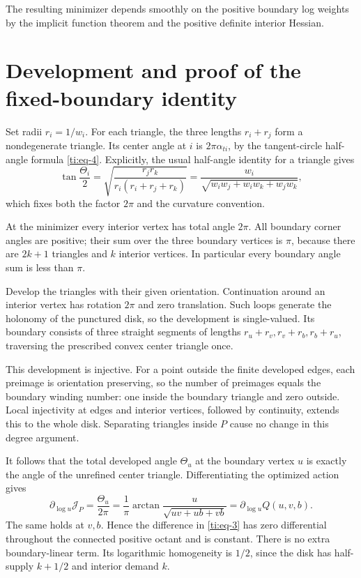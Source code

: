 \documentclass[11pt]{article}
\numberwithin{equation}{section}
\theoremstyle{definition}\newtheorem{definition}[theorem]{Definition}
\theoremstyle{remark}\newtheorem{remark}[theorem]{Remark}
\begin{document}
The resulting minimizer depends smoothly on the positive boundary log weights by the implicit function theorem and the positive definite interior Hessian.

\section{Development and proof of the fixed-boundary identity}\label{ti:sec-3}

Set radii \(r_i=1/w_i\). For each triangle, the three lengths \(r_i+r_j\) form a nondegenerate triangle. Its center angle at \(i\) is \(2\pi\alpha_{ti}\), by the tangent-circle half-angle formula \eqref{ti:eq-4}.
Explicitly, the usual half-angle identity for a triangle gives
\[
\tan\frac{\Theta_i}{2}
=\sqrt{\frac{r_jr_k}{r_i(r_i+r_j+r_k)}}
=\frac{w_i}{\sqrt{w_iw_j+w_iw_k+w_jw_k}},
\]
which fixes both the factor \(2\pi\) and the curvature convention.

At the minimizer every interior vertex has total angle \(2\pi\). All boundary corner angles are positive; their sum over the three boundary vertices is \(\pi\), because there are \(2k+1\) triangles and \(k\) interior vertices. In particular every boundary angle sum is less than \(\pi\).

Develop the triangles with their given orientation. Continuation around an interior vertex has rotation \(2\pi\) and zero translation. Such loops generate the holonomy of the punctured disk, so the development is single-valued. Its boundary consists of three straight segments of lengths \(r_u+r_v,r_v+r_b,r_b+r_u\), traversing the prescribed convex center triangle once.

This development is injective. For a point outside the finite developed edges, each preimage is orientation preserving, so the number of preimages equals the boundary winding number: one inside the boundary triangle and zero outside. Local injectivity at edges and interior vertices, followed by continuity, extends this to the whole disk. Separating triangles inside \(P\) cause no change in this degree argument.

It follows that the total developed angle \(\Theta_u\) at the boundary vertex \(u\) is exactly the angle of the unrefined center triangle. Differentiating the optimized action gives
\begin{equation}\label{ti:eq-8}
\partial_{\log u}\mathcal J_P
=\frac{\Theta_u}{2\pi}
=\frac1\pi\arctan\frac{u}{\sqrt{uv+ub+vb}}
=\partial_{\log u}Q(u,v,b).
\end{equation}
The same holds at \(v,b\). Hence the difference in \eqref{ti:eq-3} has zero differential throughout the connected positive octant and is constant. There is no extra boundary-linear term. Its logarithmic homogeneity is \(1/2\), since the disk has half-supply \(k+1/2\) and interior demand \(k\).
\end{document}
